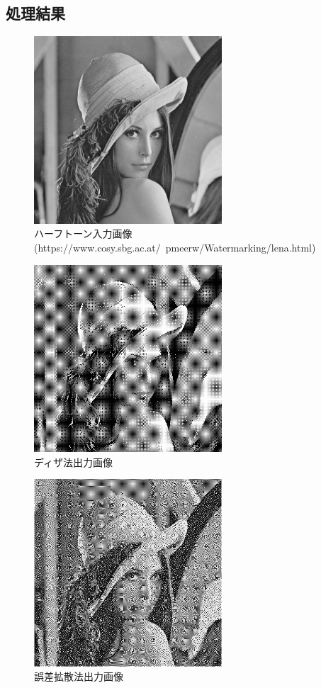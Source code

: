 \documentclass[11pt,a4j]{jsarticle}
\begin{document}
    \subsection{処理結果}
    \begin{figure}[H]
      \centering
      \includegraphics[clip,width=7.0cm ,height= 7.0cm]{./img/halftone/halftone_source.png}
      \caption{ハーフトーン入力画像(https://www.cosy.sbg.ac.at/~pmeerw/Watermarking/lena.html)\label{fig:halftone_source}}
    \end{figure}
    \begin{figure}[H]
      \centering
      \includegraphics[clip,width=7.0cm ,height= 7.0cm]{./img/halftone/dither.png}
      \caption{ディザ法出力画像\label{fig:dither_result}}
    \end{figure}
    \begin{figure}[H]
      \centering
      \includegraphics[clip,width=7.0cm ,height= 7.0cm]{./img/halftone/error.png}
      \caption{誤差拡散法出力画像\label{fig:error_result}}
    \end{figure}
\end{document}
